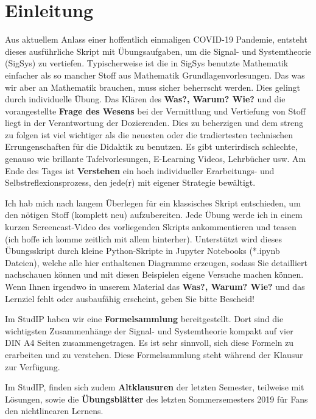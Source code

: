 \section*{Einleitung}
%
Aus aktuellem Anlass einer hoffentlich einmaligen COVID-19 Pandemie, entsteht
dieses ausführliche Skript mit Übungsaufgaben, um die Signal- und Systemtheorie
(SigSys) zu vertiefen.
%
Typischerweise ist die in SigSys benutzte Mathematik einfacher als so mancher Stoff
aus Mathematik Grundlagenvorlesungen.
%
Das was wir aber an Mathematik brauchen, muss sicher beherrscht werden.
%
Dies gelingt durch individuelle Übung.
%
Das Klären des \textbf{Was?, Warum? Wie?} und die vorangestellte \textbf{Frage des Wesens}
bei der Vermittlung und Vertiefung von Stoff liegt in der
Verantwortung der Dozierenden.
%
Dies zu beherzigen und dem streng zu folgen ist viel wichtiger als die neuesten
oder die tradiertesten technischen Errungenschaften für die Didaktik zu benutzen.
%
Es gibt unterirdisch schlechte, genauso wie brillante Tafelvorlesungen,
E-Learning Videos, Lehrbücher usw.
%
Am Ende des Tages ist \textbf{Verstehen} ein hoch individueller Erarbeitungs-
und Selbstreflexionsprozess, den jede(r) mit eigener Strategie bewältigt.
%

Ich hab mich nach langem Überlegen für ein klassisches Skript entschieden,
um den nötigen Stoff (komplett neu) aufzubereiten.
%
Jede Übung werde ich in einem kurzen Screencast-Video des vorliegenden Skripts
ankommentieren und teasen (ich hoffe ich komme zeitlich mit allem hinterher).
%
Unterstützt wird dieses Übungsskript durch kleine Python-Skripte in
Jupyter Notebooks (*.ipynb Dateien),
welche alle hier enthaltenen Diagramme erzeugen, sodass Sie
detailliert nachschauen können und mit diesen Beispielen eigene Versuche machen
können.
%
Wenn Ihnen irgendwo in unserem Material das \textbf{Was?, Warum? Wie?} und das
Lernziel fehlt oder ausbaufähig erscheint, geben Sie bitte Bescheid!

Im StudIP haben wir eine \textbf{Formelsammlung} bereitgestellt. Dort sind die
wichtigsten Zusammenhänge der Signal- und Systemtheorie kompakt auf vier DIN A4
Seiten zusammengetragen. Es ist sehr sinnvoll, sich diese Formeln zu erarbeiten
und zu verstehen. Diese Formelsammlung steht während der Klausur zur Verfügung.

Im StudIP, finden sich zudem \textbf{Altklausuren} der letzten Semester,
teilweise mit Lösungen, sowie die \textbf{Übungsblätter} des letzten
Sommersemesters 2019 für Fans den nichtlinearen Lernens.

